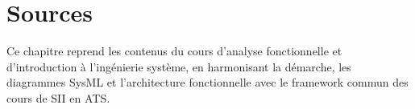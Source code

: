 \section{Sources}\label{sec:is-sources}

Ce chapitre reprend les contenus du cours d'analyse fonctionnelle et d'introduction à l'ingénierie système, en harmonisant la démarche, les diagrammes SysML et l'architecture fonctionnelle avec le framework commun des cours de SII en ATS.
